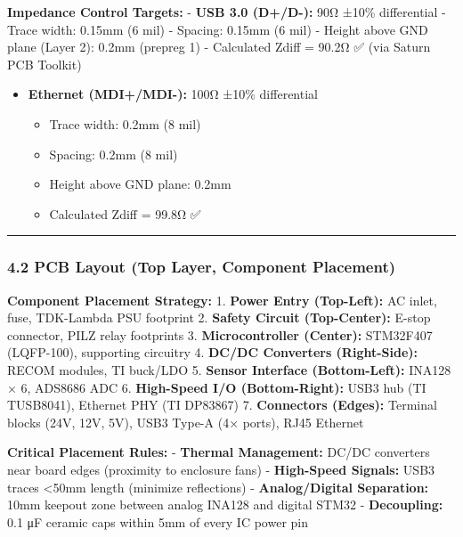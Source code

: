 \documentclass[
]{article}
\providecommand{\tightlist}{%
  \setlength{\itemsep}{0pt}\setlength{\parskip}{0pt}}
\begin{document}
\textbf{Impedance Control Targets:} - \textbf{USB 3.0 (D+/D-):} 90Ω
±10\% differential - Trace width: 0.15mm (6 mil) - Spacing: 0.15mm (6
mil) - Height above GND plane (Layer 2): 0.2mm (prepreg 1) - Calculated
Zdiff = 90.2Ω ✅ (via Saturn PCB Toolkit)

\begin{itemize}
\tightlist
\item
  \textbf{Ethernet (MDI+/MDI-):} 100Ω ±10\% differential

  \begin{itemize}
  \tightlist
  \item
    Trace width: 0.2mm (8 mil)
  \item
    Spacing: 0.2mm (8 mil)
  \item
    Height above GND plane: 0.2mm
  \item
    Calculated Zdiff = 99.8Ω ✅
  \end{itemize}
\end{itemize}

\begin{center}\rule{0.5\linewidth}{0.5pt}\end{center}

\hypertarget{pcb-layout-top-layer-component-placement}{%
\subsubsection{4.2 PCB Layout (Top Layer, Component
Placement)}\label{pcb-layout-top-layer-component-placement}}

\textbf{Component Placement Strategy:} 1. \textbf{Power Entry
(Top-Left):} AC inlet, fuse, TDK-Lambda PSU footprint 2. \textbf{Safety
Circuit (Top-Center):} E-stop connector, PILZ relay footprints 3.
\textbf{Microcontroller (Center):} STM32F407 (LQFP-100), supporting
circuitry 4. \textbf{DC/DC Converters (Right-Side):} RECOM modules, TI
buck/LDO 5. \textbf{Sensor Interface (Bottom-Left):} INA128 × 6, ADS8686
ADC 6. \textbf{High-Speed I/O (Bottom-Right):} USB3 hub (TI TUSB8041),
Ethernet PHY (TI DP83867) 7. \textbf{Connectors (Edges):} Terminal
blocks (24V, 12V, 5V), USB3 Type-A (4× ports), RJ45 Ethernet

\textbf{Critical Placement Rules:} - \textbf{Thermal Management:} DC/DC
converters near board edges (proximity to enclosure fans) -
\textbf{High-Speed Signals:} USB3 traces \textless50mm length (minimize
reflections) - \textbf{Analog/Digital Separation:} 10mm keepout zone
between analog INA128 and digital STM32 - \textbf{Decoupling:} 0.1 μF
ceramic caps within 5mm of every IC power pin
\end{document}
